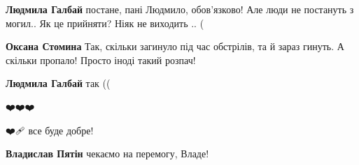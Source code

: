 \begin{itemize} %
\textbf{Людмила Галбай} постане, пані Людмило, обов'язково! Але люди не постануть з могил.. Як це прийняти? Ніяк не виходить .. (

\textbf{Оксана Стомина} Так, скільки загинуло під час обстрілів, та й зараз гинуть. А скільки пропало! Просто іноді такий розпач!

\textbf{Людмила Галбай} так ((

\end{itemize} %


❤️❤️❤️

❤️🩹 все буде добре!

\textbf{Владислав Пятін} чекаємо на перемогу, Владе!

